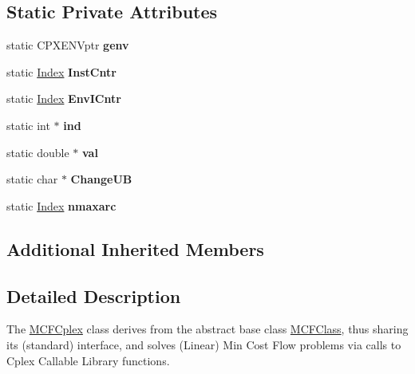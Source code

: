 \subsection*{Static Private Attributes}
\begin{DoxyCompactItemize}
\item 
\mbox{\label{class_m_c_f_cplex_a6734f84bb66df897c2eaa64f7109b5cf}} 
static C\+P\+X\+E\+N\+Vptr {\bfseries genv}
\item 
\mbox{\label{class_m_c_f_cplex_a1cffb4f8595e57deaa1b04109cb2723a}} 
static \mbox{\hyperlink{class_m_c_f_class_ad53d6229d7ec28555a9c9c2fd9abf773}{Index}} {\bfseries Inst\+Cntr}
\item 
\mbox{\label{class_m_c_f_cplex_aba02600b1301447c65e0ae9bc944e046}} 
static \mbox{\hyperlink{class_m_c_f_class_ad53d6229d7ec28555a9c9c2fd9abf773}{Index}} {\bfseries Env\+I\+Cntr}
\item 
\mbox{\label{class_m_c_f_cplex_abf6fe97795b10bba2698b51120e35186}} 
static int $\ast$ {\bfseries ind}
\item 
\mbox{\label{class_m_c_f_cplex_a4d722a7e6b4f6703c4ee90ee8a26f49a}} 
static double $\ast$ {\bfseries val}
\item 
\mbox{\label{class_m_c_f_cplex_a4f273705b9160da0e104695971c3d71d}} 
static char $\ast$ {\bfseries Change\+UB}
\item 
\mbox{\label{class_m_c_f_cplex_a7b400596c0d77d9fd8795665c8201a69}} 
static \mbox{\hyperlink{class_m_c_f_class_ad53d6229d7ec28555a9c9c2fd9abf773}{Index}} {\bfseries nmaxarc}
\end{DoxyCompactItemize}
\subsection*{Additional Inherited Members}


\subsection{Detailed Description}
The \mbox{\hyperlink{class_m_c_f_cplex}{M\+C\+F\+Cplex}} class derives from the abstract base class \mbox{\hyperlink{class_m_c_f_class}{M\+C\+F\+Class}}, thus sharing its (standard) interface, and solves (Linear) Min Cost Flow problems via calls to Cplex Callable Library functions. 

